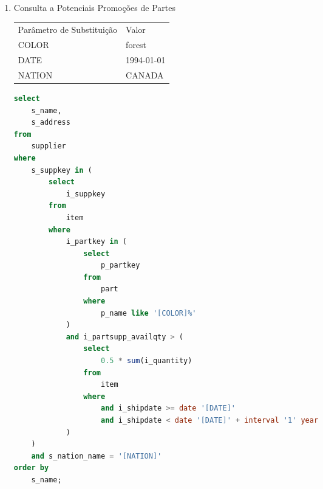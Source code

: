 \begin{enumerate}
	\begin{lstlisting}[language=SQL]
select
    sum(i_extendedprice* (1 - i_discount)) as revenue
from
    item,
    part
where
    (
        p_partkey = i_partkey
        and p_brand = '[BRAND1]'
        and p_container in ('SM CASE', 'SM BOX', 'SM PACK', 'SM PKG')
        and i_quantity >= [QUANTITY1] and i_quantity <= [QUANTITY1] + 10
        and p_size between 1 and 5
        and i_shipmode in ('AIR', 'AIR REG')
        and i_shipinstruct = 'DELIVER IN PERSON'
    )
    or
    (
        p_partkey = i_partkey
        and p_brand = '[BRAND2]'
        and p_container in ('MED BAG', 'MED BOX', 'MED PKG', 'MED PACK')
        and i_quantity >= [QUANTITY2] and i_quantity <= [QUANTITY2] + 10
        and p_size between 1 and 10
        and i_shipmode in ('AIR', 'AIR REG')
        and i_shipinstruct = 'DELIVER IN PERSON'
    )
    or
    (
        p_partkey = i_partkey
        and p_brand = '[BRAND3]'
        and p_container in ('LG CASE', 'LG BOX', 'LG PACK', 'LG PKG')
        and i_quantity >= [QUANTITY3] and i_quantity <= [QUANTITY3] + 10
        and p_size between 1 and 15
        and i_shipmode in ('AIR', 'AIR REG')
        and i_shipinstruct = 'DELIVER IN PERSON'
    );
	\end{lstlisting}

\item Consulta a Potenciais Promoções de Partes

\begin{tabular}{ll}
	Parâmetro de Substituição & Valor\\
	COLOR & forest\\
	DATE & 1994-01-01\\
	NATION & CANADA\\
\end{tabular}

	\begin{lstlisting}[language=SQL]
select
    s_name,
    s_address
from
    supplier
where
    s_suppkey in (
        select
            i_suppkey
        from
            item
        where
            i_partkey in (
                select
                    p_partkey
                from
                    part
                where
                    p_name like '[COLOR]%'
            )
            and i_partsupp_availqty > (
                select
                    0.5 * sum(i_quantity)
                from
                    item
                where
                    and i_shipdate >= date '[DATE]'
                    and i_shipdate < date '[DATE]' + interval '1' year
            )
    )
    and s_nation_name = '[NATION]'
order by
    s_name;


\end{lstlisting}
\end{enumerate}
